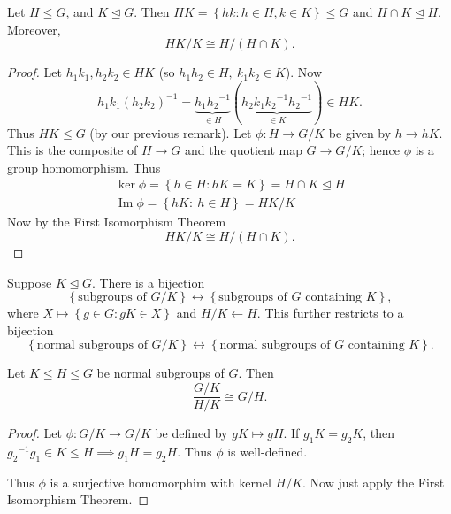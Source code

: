 \documentclass[egregdoesnotlikesansseriftitles,a4paper]{scrartcl}
\begin{document}
\begin{theorem}
      Let $H \leq G$, and $K \unlhd G$. Then $HK = \left\{hk: h \in H, k \in K\right\} \leq G$ and $H \cap K \unlhd H$. Moreover, \[
      HK/K \cong H/(H \cap K)
      .\] 
\end{theorem}
\begin{proof}
      Let $h_1 k_1 , h_2 k_2 \in HK$ (so $h_1 h_2 \in H, \ k_1 k_2 \in K$). Now \[
      h_1 k_1 {(h_2 k_2 )}^{-1}=\underbrace{h_1 {h_2 }^{-1}}_{\in H} (\underbrace{h_2 k_1 {k_2 }^{-1} {h_2 }^{-1}}_{\in K} )\in HK 
      .\] 
     Thus $HK \leq G$ (by our previous remark). Let $\phi: H \rightarrow G/K$ be given by $h \rightarrow hK$. This is the composite of $H \rightarrow G$ and the quotient map $G \rightarrow G/K$; hence $\phi$ is a group homomorphism. Thus
     \begin{align*}
          \operatorname{ker} \phi = \left\{h \in H: hK=K\right\}=H \cap K \unlhd H \\
          \operatorname{Im} \phi = \left\{hK: \ h \in H\right\}=HK/K
     \end{align*}
     Now by the First Isomorphism Theorem \[
     HK/K \cong H/(H \cap K)
     .\] 
\end{proof}
\begin{lemma}\label{1p2}
      Suppose $K \unlhd G$. There is a bijection \[
      \left\{\text{subgroups of }G/K\right\} \leftrightarrow \left\{\text{subgroups of }G \text{ containing }K\right\}
      ,\] 
     where $X \mapsto \left\{g \in G: gK \in X\right\}$ and $H/K \leftarrow H$. This further restricts to a bijection 
     \[
      \left\{\text{normal subgroups of }G/K\right\} \leftrightarrow \left\{\text{normal subgroups of }G \text{ containing }K\right\}
      .\] 
\end{lemma}
\begin{theorem}
      Let $K \leq H \leq G$ be normal subgroups of $G$. Then \[
      \frac{G/K}{H/K} \cong G/H
      .\] 
\end{theorem}
\begin{proof}
      Let $\phi: G/K \rightarrow G/K$ be defined by $gK \mapsto gH$. If $g_1 K= g_2 K$, then ${g_2 }^{-1}g_1 \in K \leq H \implies  g_1 H= g_2 H$. Thus $\phi$ is well-defined.
      
      Thus $\phi$ is a surjective homomorphim with kernel $H/K$. Now just apply the First Isomorphism Theorem.
\end{proof}
\end{document}
